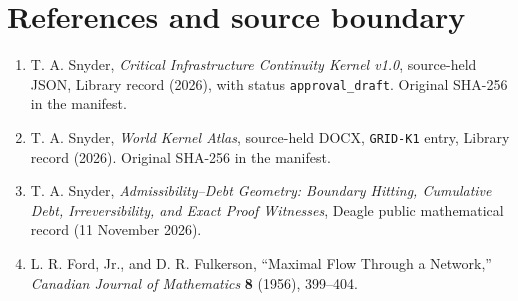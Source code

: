 \documentclass[11pt,letterpaper]{article}
\theoremstyle{definition}\newtheorem{definition}[theorem]{Definition}\newtheorem{example}[theorem]{Example}
\theoremstyle{remark}\newtheorem{remark}[theorem]{Remark}
\begin{document}
\section{References and source boundary}
\begin{enumerate}
\item T. A. Snyder, \emph{Critical Infrastructure Continuity Kernel v1.0}, source-held JSON, Library record (2026), with status \texttt{approval\_draft}. Original SHA-256 in the manifest.
\item T. A. Snyder, \emph{World Kernel Atlas}, source-held DOCX, \texttt{GRID-K1} entry, Library record (2026). Original SHA-256 in the manifest.
\item T. A. Snyder, \emph{Admissibility--Debt Geometry: Boundary Hitting, Cumulative Debt, Irreversibility, and Exact Proof Witnesses}, Deagle public mathematical record (11 November 2026).
\item L. R. Ford, Jr., and D. R. Fulkerson, ``Maximal Flow Through a Network,'' \emph{Canadian Journal of Mathematics} \textbf{8} (1956), 399--404.
\end{enumerate}
\end{document}

